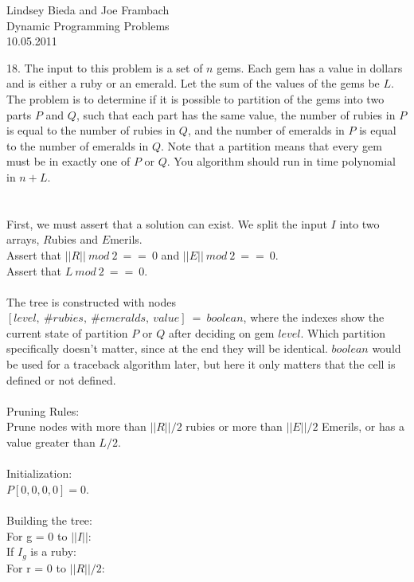 \documentclass[10pt]{article}
\newcommand{\tab}{\hspace*{2em}}
\newcommand{\tabb}{\hspace*{4em}}
\newcommand{\norm}[1]{\left|\left|#1\right|\right|}
\begin{document}
	\begin{flushright}
	Lindsey Bieda and Joe Frambach\\
	Dynamic Programming Problems\\
	10.05.2011
	\end{flushright}
	18.	The input to this problem is a set of $n$ gems. Each gem has a value in dollars and is either a ruby or
			an emerald. Let the sum of the values of the gems be $L$. The problem is to determine if it is possible
			to partition of the gems into two parts $P$ and $Q$, such that each part has the same value, the number
			of rubies in $P$ is equal to the number of rubies in $Q$, and the number of emeralds in $P$ is equal to the
			number of emeralds in $Q$. Note that a partition means that every gem must be in exactly one of $P$ or
			$Q$. You algorithm should run in time polynomial in $n + L$.\\
			\\
			\\
			First, we must assert that a solution can exist. We split the input $I$ into two arrays, $R$ubies and $E$merils.\\
			Assert that $\norm{R}~mod~2~==~0$ and $\norm{E}~mod~2~==~0$.\\
			Assert that $L~mod~2~==~0$.\\
			\\
			The tree is constructed with nodes $[level,~\#rubies,~\#emeralds,~value]~=~boolean$, where the indexes show
			the current state of partition $P$ or $Q$ after deciding on gem $level$. Which partition specifically
			doesn't matter, since at the end they will be identical. $boolean$ would be used for a traceback
			algorithm later, but here it only matters that the cell is defined or not defined.\\
			\\
			Pruning Rules:\\
			Prune nodes with more than $\norm{R}/2$ rubies or more than $\norm{E}/2$ Emerils, or has a value greater than $L/2$.\\
			\\
			Initialization:\\
			$P[0,0,0,0]=0$.\\
			\\
			Building the tree:\\
			For g = 0 to $\norm{I}$:\\
			\tab If $I_{g}$ is a ruby:\\
			\tabb For r = 0 to $\norm{R}/2$:\\
\end{document}
